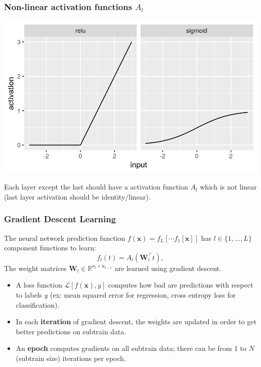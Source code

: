 \documentclass{beamer}
\begin{document}
\begin{frame}
  \frametitle{Non-linear activation functions $A_l$}
  \includegraphics[width=\textwidth]{figure-activations}

Each layer except the last should have a activation function $A_l$
which is not linear (last layer activation should be identity/linear).
\end{frame}

\begin{frame}
  \frametitle{Gradient Descent Learning}

  The neural network prediction function
  $f(\mathbf x) = f_L[\cdots f_1[\mathbf x] ]$ has $l\in\{1,\dots,L\}$
  component functions to learn:
\begin{equation}
  f_l(t) = A_l( \mathbf W_l^\intercal t ),
\end{equation}
The weight matrices $\mathbf W_l\in\mathbb R^{u_l\times u_{l-1}}$ are
learned using gradient descent.
\begin{itemize}
\item A loss function $\mathcal L[f(\mathbf x), y]$ computes how bad
  are predictions with respect to labels $y$ (ex: mean squared error
  for regression, cross entropy loss for classification).
\item In each \textbf{iteration} of gradient descent, the weights are
  updated in order to get better predictions on subtrain data.
\item An \textbf{epoch} computes gradients on all subtrain data;
  there can be from 1 to $N$(subtrain size) iterations per epoch.
\end{itemize}
\end{frame}
\end{document}
